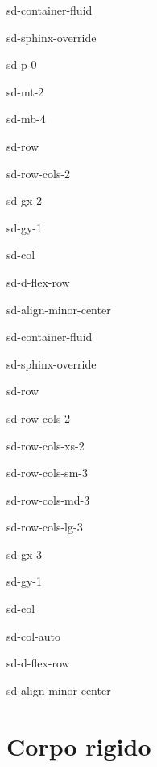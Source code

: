 \documentclass[letterpaper,10pt,english]{jupyterBook}
\begin{document}
\begin{sphinxuseclass}{sd-container-fluid}
\begin{sphinxuseclass}{sd-sphinx-override}
\begin{sphinxuseclass}{sd-p-0}
\begin{sphinxuseclass}{sd-mt-2}
\begin{sphinxuseclass}{sd-mb-4}
\begin{sphinxuseclass}{sd-row}
\begin{sphinxuseclass}{sd-row-cols-2}
\begin{sphinxuseclass}{sd-gx-2}
\begin{sphinxuseclass}{sd-gy-1}
\begin{sphinxuseclass}{sd-col}
\begin{sphinxuseclass}{sd-d-flex-row}
\begin{sphinxuseclass}{sd-align-minor-center}
\begin{sphinxuseclass}{sd-container-fluid}
\begin{sphinxuseclass}{sd-sphinx-override}
\begin{sphinxuseclass}{sd-row}
\begin{sphinxuseclass}{sd-row-cols-2}
\begin{sphinxuseclass}{sd-row-cols-xs-2}
\begin{sphinxuseclass}{sd-row-cols-sm-3}
\begin{sphinxuseclass}{sd-row-cols-md-3}
\begin{sphinxuseclass}{sd-row-cols-lg-3}
\begin{sphinxuseclass}{sd-gx-3}
\begin{sphinxuseclass}{sd-gy-1}
\begin{sphinxuseclass}{sd-col}
\begin{sphinxuseclass}{sd-col-auto}
\begin{sphinxuseclass}{sd-d-flex-row}
\begin{sphinxuseclass}{sd-align-minor-center}
\end{sphinxuseclass}
\end{sphinxuseclass}
\end{sphinxuseclass}
\end{sphinxuseclass}
\end{sphinxuseclass}
\end{sphinxuseclass}
\end{sphinxuseclass}
\end{sphinxuseclass}
\end{sphinxuseclass}
\end{sphinxuseclass}
\end{sphinxuseclass}
\end{sphinxuseclass}
\end{sphinxuseclass}
\end{sphinxuseclass}
\end{sphinxuseclass}
\end{sphinxuseclass}
\end{sphinxuseclass}
\end{sphinxuseclass}
\end{sphinxuseclass}
\end{sphinxuseclass}
\end{sphinxuseclass}
\end{sphinxuseclass}
\end{sphinxuseclass}
\end{sphinxuseclass}
\end{sphinxuseclass}
\end{sphinxuseclass}

\section{Corpo rigido}
\label{\detokenize{ch/lagrange-rigid-body:corpo-rigido}}\label{\detokenize{ch/lagrange-rigid-body:classical-mechanics-lagrange-rigid}}\label{\detokenize{ch/lagrange-rigid-body::doc}}
\sphinxstepscope
\end{document}
